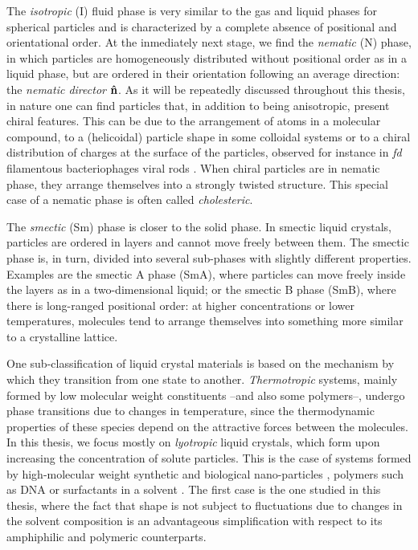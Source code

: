 The {\em isotropic} (I) fluid phase is very similar to the gas and liquid phases for spherical particles and is characterized by a complete absence of positional and orientational order. At the inmediately next stage, we find the {\em nematic} (N) phase, in which particles are homogeneously distributed without positional order as in a liquid phase, but are ordered in their orientation following an average direction: the {\em nematic director} ${\bf \hat{n}}$. As it will be repeatedly discussed throughout this thesis, in nature one can find particles that, in addition to being anisotropic, present chiral features. This can be due to the arrangement of atoms in a molecular compound, to a (helicoidal) particle shape in some colloidal systems or to a chiral distribution of charges at the surface of the particles, observed for instance in {\em fd} filamentous bacteriophages viral rods \cite{Gibaud_2017}. When chiral particles are in nematic phase, they arrange themselves into a strongly twisted structure. This special case of a nematic phase is often called {\em cholesteric}.

The {\em smectic} (Sm) phase is closer to the solid phase. In smectic liquid crystals, particles are ordered in layers and cannot move freely between them. The smectic phase is, in turn, divided into several sub-phases with slightly different properties. Examples are the smectic A phase (SmA), where particles can move freely inside the layers as in a two-dimensional liquid; or the smectic B phase (SmB), where there is long-ranged positional order: at higher concentrations or lower temperatures, molecules tend to arrange themselves into something more similar to a crystalline lattice.

One sub-classification of liquid crystal materials is based on the mechanism by which they transition from one state to another. {\em Thermotropic} systems, mainly formed by low molecular weight constituents --and also some polymers--, undergo phase transitions due to changes in temperature, since the thermodynamic properties of these species depend on the attractive forces between the molecules. In this thesis, we focus mostly on  {\em lyotropic} liquid crystals, which form upon increasing the concentration of solute particles. This is the case of systems formed by high-molecular weight synthetic and biological nano-particles \cite{sonin1998inorganic,dogic-fraden_fil}, polymers such as DNA \cite{livolantDNAoverview} or surfactants in a solvent \cite{fontell1981}. The first case is the one studied in this thesis, where the fact that shape is not subject to fluctuations due to changes in the solvent composition is an advantageous simplification with respect to its amphiphilic and polymeric counterparts.

